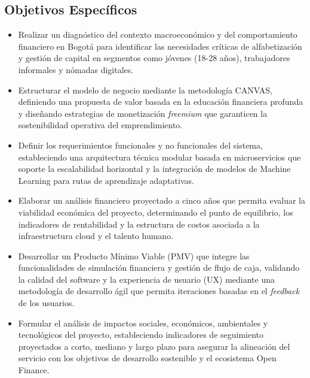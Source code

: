 \subsection*{Objetivos Específicos}

\begin{itemize}
	\item Realizar un diagnóstico del contexto macroeconómico y del comportamiento financiero en Bogotá para identificar las necesidades críticas de alfabetización y gestión de capital en segmentos como jóvenes (18-28 años), trabajadores informales y nómadas digitales.
	
	\item Estructurar el modelo de negocio mediante la metodología CANVAS, definiendo una propuesta de valor basada en la educación financiera profunda y diseñando estrategias de monetización \textit{freemium} que garanticen la sostenibilidad operativa del emprendimiento.
	
	\item Definir los requerimientos funcionales y no funcionales del sistema, estableciendo una arquitectura técnica modular basada en microservicios que soporte la escalabilidad horizontal y la integración de modelos de Machine Learning para rutas de aprendizaje adaptativas.
	
	\item Elaborar un análisis financiero proyectado a cinco años que permita evaluar la viabilidad económica del proyecto, determinando el punto de equilibrio, los indicadores de rentabilidad y la estructura de costos asociada a la infraestructura cloud y el talento humano.
	
	\item Desarrollar un Producto Mínimo Viable (PMV) que integre las funcionalidades de simulación financiera y gestión de flujo de caja, validando la calidad del software y la experiencia de usuario (UX) mediante una metodología de desarrollo ágil que permita iteraciones basadas en el \textit{feedback} de los usuarios.
	
	\item Formular el análisis de impactos sociales, económicos, ambientales y tecnológicos del proyecto, estableciendo indicadores de seguimiento proyectados a corto, mediano y largo plazo para asegurar la alineación del servicio con los objetivos de desarrollo sostenible y el ecosistema Open Finance.
\end{itemize}
